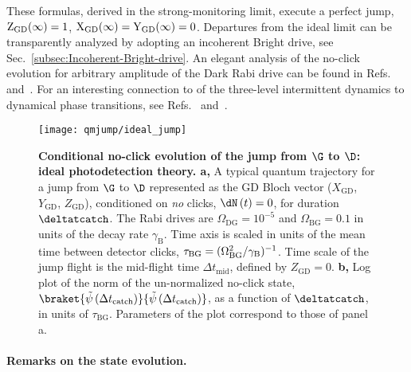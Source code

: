 These formulas, derived in the strong-monitoring limit, execute a
perfect jump, ${\rm Z}_{{\rm GD}}(\infty)=1$, ${\rm X}_{{\rm GD}}(\infty)={\rm Y}_{{\rm GD}}(\infty)=0$.
Departures from the ideal limit can be transparently analyzed by adopting
an incoherent Bright drive, see Sec.~\ref{subsec:Incoherent-Bright-drive}.
An elegant analysis of the no-click evolution for arbitrary amplitude
of the Dark Rabi drive can be found in Refs.~\citet{Ruskov2007}
and~\citet{Ruskov2009-unpublished}. For an interesting connection
to of the three-level intermittent dynamics to dynamical phase transitions,
see Refs.~\citet{Lesanovsky2013} and~\citet{Garrahan2018}.
\begin{figure}
\begin{centering}
\texttt{[image: qmjump/ideal\_jump]}
\par\end{centering}
\caption[Conditional no-click evolution of the jump from $\G$ to $\D$: ideal
photodetection theory.]{\textbf{\label{fig:Conditional-no-click-evolution}Conditional no-click
evolution of the jump from $\G$ to $\D$: ideal photodetection theory.
a, }A typical quantum trajectory for a jump from $\G$ to $\D$ represented
as the GD Bloch vector ($X_{\mathrm{GD}}$, $Y_{\mathrm{GD}}$, $Z_{\mathrm{GD}}$),
conditioned on \emph{no }clicks, $\dN\left(t\right)=0$, for duration
$\deltatcatch$. The Rabi drives are $\Omega_{\mathrm{DG}}=10^{-5}$
and $\Omega_{\mathrm{BG}}=0.1$ in units of the decay rate $\gamma_{\mathrm{B}}$.
Time axis is scaled in units of the mean time between detector clicks,
$\tau_{\mathrm{BG}}=(\Omega_{{\rm BG}}^{2}/\gamma_{\mathrm{B}})^{-1}$.
Time scale of the jump flight is the mid-flight time $\Delta t_{\mathrm{mid}}$,
defined by $Z_{\mathrm{GD}}=0$. \textbf{b,} Log plot of the norm
of the un-normalized no-click state, $\braket{\tilde{\psi}\left(\Delta t_{\mathrm{catch}}\right)}{\tilde{\psi}\left(\Delta t_{\mathrm{catch}}\right)}$,
as a function of $\deltatcatch$, in units of $\tau_{\mathrm{BG}}$.
Parameters of the plot correspond to those of panel a. }
\end{figure}


\paragraph{Remarks on the state evolution. }

